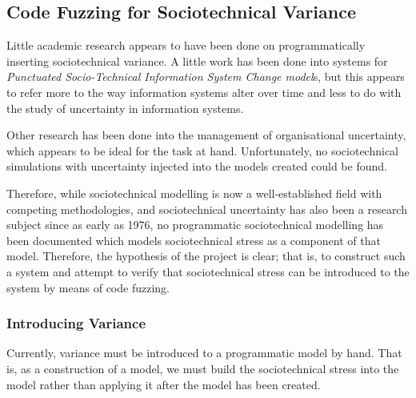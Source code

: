 \documentclass{sig-alternate}
\begin{document}
\subsection{Code Fuzzing for Sociotechnical Variance}
Little academic research appears to have been done on programmatically inserting sociotechnical variance. A little work has been done into systems for \emph{Punctuated Socio-Technical Information System Change model}s\cite{Lyytinen2008}, but this appears to refer more to the way information systems alter over time and less to do with the study of uncertainty in information systems. \par
Other research has been done into the management of organisational uncertainty\cite{grote2004uncertainty}\cite{Herrmann1999}, which appears to be ideal for the task at hand. Unfortunately, no sociotechnical simulations with uncertainty injected into the models created could be found. \par
Therefore, while sociotechnical modelling is now a well-established field with competing methodologies, and sociotechnical uncertainty has also been a research subject since as early as 1976\cite{Susman1976}, no programmatic sociotechnical modelling has been documented which models sociotechnical stress as a component of that model. Therefore, the hypothesis of the project is clear; that is, to construct such a system and attempt to verify that sociotechnical stress can be introduced to the system by means of code fuzzing. \par

\subsubsection{Introducing Variance}
\label{Variance_research}
Currently, variance must be introduced to a programmatic model by hand. That is, as a construction of a model, we must build the sociotechnical stress into the model rather than applying it after the model has been created. \par
\end{document}
